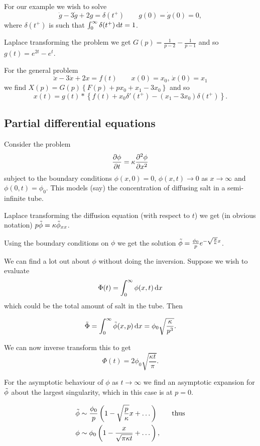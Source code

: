 \documentclass{notes}
\theoremstyle{plain}
\begin{document}
For our example we wish to solve
\[
\ddot{g} - 3 \dot{g} + 2 g = \delta(t^+) \qquad g(0) = \dot{g}(0) = 0,
\]
where $\delta(t^+)$ is such that $\int_0^\infty \delta(t^+)\, \mathrm{d} t = 1$.

Laplace transforming the problem we get $G(p) = \frac{1}{p-2} - \frac{1}{p-1}$
and so $g(t) = e^{2 t} - e^t$.

For the general problem
\[
\ddot{x} - 3 \dot{x} + 2 x = f(t)\qquad x(0) = x_0,\, \dot{x}(0) = x_1
\]
we find $X(p) = G(p) \left\{ F(p) + p x_0 + x_1 - 3 x_0\right\}$ and
so
\[
x(t) = g(t) \ast \left\{ f(t) + x_0\delta'(t^+) - (x_1 - 3 x_0) \delta(t^+)
\right\}.
\]

\subsection{Partial differential equations}

Consider the problem
\[
\frac{\partial \phi}{\partial t} = \kappa \frac{\partial ^2 \phi}{\partial x^2}
\]
subject to the boundary conditions $\phi(x,0) = 0$, $\phi(x,t) \to 0$
as $x \to \infty$ and $\phi(0,t) = \phi_0$.  This models (say) the
concentration of diffusing salt in a semi-infinite tube.

Laplace transforming the diffusion equation (with respect to $t$) we
get (in obvious notation) $p \Tilde{\phi} = \kappa \Tilde{\phi}_{xx}$.

Using the boundary conditions on $\phi$ we get the solution
$\Tilde{\phi} = \frac{\phi_0}{p} e^{-\sqrt{\frac{p}{\kappa}} x}$.

We can find a lot out about $\phi$ without doing the inversion.  Suppose
we wish to evaluate
\[
\Phi(t) = \int_0^\infty \phi(x,t)\, \mathrm{d} x
\]
which could be the total amount of salt in the tube.  Then

\[
\Tilde{\Phi} = \int_0^\infty \Tilde{\phi}(x,p)\, \mathrm{d} x
= \phi_0 \sqrt{\frac{\kappa}{p^3}}.
\]

We can now inverse transform this to get
\[
\Phi(t) = 2 \phi_0 \sqrt{\frac{\kappa t}{\pi}}.
\]

For the asymptotic behaviour of $\phi$ as $t \to \infty$ we find
an asymptotic expansion for $\Tilde{\phi}$ about the largest singularity,
which in this case is at $p = 0$.

\begin{align*}
\Tilde{\phi} &\sim \frac{\phi_0}{p} \left(1 - \sqrt{\frac{p}{\kappa}} x
+ \dots \right) \qquad \text{thus} \\
\phi &\sim \phi_0 \left( 1 - \frac{x}{\sqrt{\pi \kappa t}} + \dots \right),
\end{align*}
\end{document}
